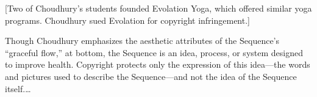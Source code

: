 %

[Two of Choudhury's students founded Evolation
Yoga, which offered similar yoga programs. Choudhury sued Evolation for
copyright infringement.]

%


Though Choudhury emphasizes the aesthetic attributes of the
Sequence's ``graceful flow,'' at bottom, the Sequence is an idea, process,
or system designed to improve health. Copyright protects only the
expression of this idea---the words and pictures used to describe the
Sequence---and not the idea of the Sequence itself.\ldots




